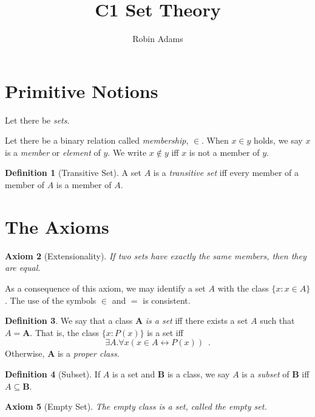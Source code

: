 \documentclass{article}
\title{C1 Set Theory}
\author{Robin Adams}
\newtheorem{axiom}{Axiom}
\theoremstyle{definition}
\newtheorem{definition}[axiom]{Definition}
\begin{document}
    \maketitle

    \section{Primitive Notions}

    Let there be \emph{sets}.

    Let there be a binary relation called \emph{membership}, $\in$. When $x \in y$ holds, we say $x$ is a
    \emph{member} or \emph{element} of $y$. We write $x \notin y$ iff $x$ is not a member of $y$.

    \begin{definition}[Transitive Set]
        A set $A$ is a \emph{transitive set} iff every member of a member of $A$ is a member of $A$.
    \end{definition}

    \section{The Axioms}

    \begin{axiom}[Extensionality]
        If two sets have exactly the same members, then they are equal.
    \end{axiom}

    As a consequence of this axiom, we may identify a set $A$ with the class $\{ x : x \in A \}$. The use of
    the symbols $\in$ and $=$ is consistent.

    \begin{definition}
    We say that a class $\mathbf{A}$ \emph{is a set} iff there exists a set $A$ such that $A = \mathbf{A}$.
    That is, the class $\{ x : P(x) \}$ is a set iff
    \[ \exists A. \forall x (x \in A \leftrightarrow P(x)) \enspace . \]
    Otherwise, $\mathbf{A}$ is a \emph{proper class}.
    \end{definition}

    \begin{definition}[Subset]
        If $A$ is a set and $\mathbf{B}$ is a class, we say $A$ is a \emph{subset} of $\mathbf{B}$
        iff $A \subseteq \mathbf{B}$.
    \end{definition}

    \begin{axiom}[Empty Set]
        The empty class is a set, called the \emph{empty set}.
    \end{axiom}
\end{document}
